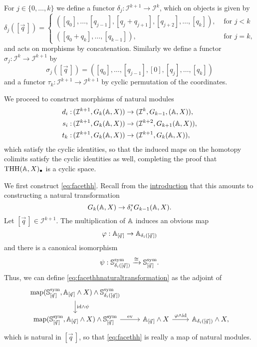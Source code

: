 For $j\in \{0,\ldots, k\}$ we define a functor $\delta_j:\mathcal{I}^{k + 1}\rightarrow \mathcal{I}^k$,
which on objects is given by
\begin{equation*}
\delta_j([\vec{q}\,]) = 
\begin{cases}
([q_0],\ldots, [q_{ j - 1}] , [q_j + q_{ j + 1}] , 
[q_{ j + 2}] ,\ldots , [q_k]), &\text{ for } j<k \\
([q_0 + q_k],\ldots,[q_{k - 1} ]), &\text{ for } j = k,
\end{cases}
\end{equation*}
and acts on morphisms by concatenation. Similarly we define a functor
$\sigma_j : \mathcal{I}^k\rightarrow \mathcal{I}^{ k + 1}$ by
$$\sigma_j([\vec{q}\,]) = 
([q_0],\ldots, [ q_{ j - 1 } ], [0]
,[q_j],\ldots , [q_k])$$
and a functor $\tau_k : \mathcal{I}^{k+1}\rightarrow \mathcal{I}^{ k + 1}$
by cyclic permutation of the coordinates.

We proceed to construct morphisms of natural modules
\begin{align}
d_i: &\,(\mathcal{I}^{k+1},G_{k}(\mathbb{A}, X))\to (\mathcal{I}^k,  G_{k-1}, (\mathbb{A}, X)), \label{eq:facethh}\\
s_i: &\,(\mathcal{I}^{k+1}, G_{k}(\mathbb{A}, X)) \to (\mathcal{I}^{k+2}, G_{k+1}(\mathbb{A}, X)),\label{eq:degeneracythh}\\
t_k: &\,(\mathcal{I}^{k+1}, G_{k}(\mathbb{A}, X))\to (\mathcal{I}^{k+1}, G_{k}(\mathbb{A}, X))\label{eq:cyclicthh},
\end{align}
which satisfy the cyclic identities, so that the induced maps 
on the homotopy colimits satisfy the cyclic identities as well,
completing the proof that $\mathrm{THH}(\mathbb{A}, X)_\bullet$ is a cyclic space.

We first construct \eqref{eq:facethh}. Recall from the \hyperref[sec:naturalmodules]{introduction}
that this amounts to constructing
a natural transformation
\begin{equation}\label{eq:facethhnaturaltransformation}
G_k(\mathbb{A},X)\to \delta_i^\ast G_{k-1}(\mathbb{A},X).
\end{equation}
Let $[\vec{q}\,]\in \mathcal{I}^{k+1}$.
The multiplication of $\mathbb{A}$ induces an obvious map
\[\varphi:\mathbb{A}_{[\vec{q}\,]}\to \mathbb{A}_{\delta_i([\vec{q}\,])}
\]
and there is a canonical isomorphism
\[\psi:\mathbb{S}^{\mathrm{sym}}_{\delta_i([\vec{q}\,])}\xrightarrow{\cong }
\mathbb{S}^{\mathrm{sym}}_{[\vec{q}\,]}.
\]
Thus, we can define \eqref{eq:facethhnaturaltransformation} as the adjoint of
\[
\begin{tikzcd}
 \map(\spherespectrum^{\mathrm{sym}}_{[\vec{q}\,]},\A_{[\vec{q}\,]}\wedge X) \wedge
\spherespectrum^{\mathrm{sym}}_{\delta_i([\vec{q}\,])} 
\arrow{d}{\mathrm{id}\wedge \psi}\\
\map(\spherespectrum^{\mathrm{sym}}_{[\vec{q}\,]},\A_{[\vec{q}\,]}\wedge X) \wedge
\spherespectrum^{\mathrm{sym}}_{[\vec{q}\,]}
\arrow{r}{\mathrm{ev}}
&\A_{[\vec{q}\,]}\wedge X
\arrow{r}{\varphi\wedge \mathrm{id}} 
&\A_{\delta_i([\vec{q}\,])}\wedge X,
\end{tikzcd}
\]
which is natural in $[\vec{q}\,]$, so that \eqref{eq:facethh} is really a map of 
natural modules.

